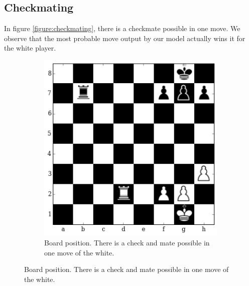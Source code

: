 \subsection{Checkmating}
In figure \ref{figure:checkmating}, there is a checkmate possible in one move. 
We observe that the most probable move output by our model actually wins it for 
the white player.
\begin{figure}[H]
\hspace*{-0.5in}  
  \centering
    \begin{subfigure}[t]{\textwidth}
        \centering
        \includegraphics[scale=0.75]{img/best_moves/output_21_0.png}
        \caption{Board position. There is a check and mate 
possible in one move of the white.}
    \end{subfigure}%


\end{figure}
